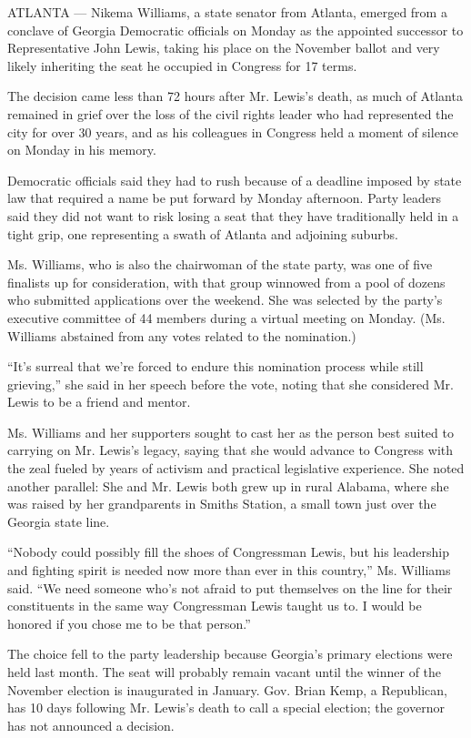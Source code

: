 ATLANTA --- Nikema Williams, a state senator from Atlanta, emerged from
a conclave of Georgia Democratic officials on Monday as the appointed
successor to Representative John Lewis, taking his place on the November
ballot and very likely inheriting the seat he occupied in Congress for
17 terms.

The decision came less than 72 hours after Mr. Lewis's death, as much of
Atlanta remained in grief over the loss of the civil rights leader who
had represented the city for over 30 years, and as his colleagues in
Congress held a moment of silence on Monday in his memory.

Democratic officials said they had to rush because of a deadline imposed
by state law that required a name be put forward by Monday afternoon.
Party leaders said they did not want to risk losing a seat that they
have traditionally held in a tight grip, one representing a swath of
Atlanta and adjoining suburbs.

Ms. Williams, who is also the chairwoman of the state party, was one of
five finalists up for consideration, with that group winnowed from a
pool of dozens who submitted applications over the weekend. She was
selected by the party's executive committee of 44 members during a
virtual meeting on Monday. (Ms. Williams abstained from any votes
related to the nomination.)

``It's surreal that we're forced to endure this nomination process while
still grieving,'' she said in her speech before the vote, noting that
she considered Mr. Lewis to be a friend and mentor.

Ms. Williams and her supporters sought to cast her as the person best
suited to carrying on Mr. Lewis's legacy, saying that she would advance
to Congress with the zeal fueled by years of activism and practical
legislative experience. She noted another parallel: She and Mr. Lewis
both grew up in rural Alabama, where she was raised by her grandparents
in Smiths Station, a small town just over the Georgia state line.

``Nobody could possibly fill the shoes of Congressman Lewis, but his
leadership and fighting spirit is needed now more than ever in this
country,'' Ms. Williams said. ``We need someone who's not afraid to put
themselves on the line for their constituents in the same way
Congressman Lewis taught us to. I would be honored if you chose me to be
that person.''

The choice fell to the party leadership because Georgia's primary
elections were held last month. The seat will probably remain vacant
until the winner of the November election is inaugurated in January.
Gov. Brian Kemp, a Republican, has 10 days following Mr. Lewis's death
to call a special election; the governor has not announced a decision.

